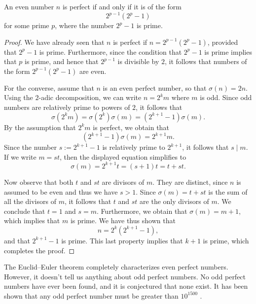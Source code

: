 \begin{theorem}
  An even number $n$ is perfect if and only if it is of the form
  \begin{equation*}
    2^{p-1}(2^p-1)
  \end{equation*}
  for some prime $p$, where the number $2^p-1$ is prime.
\end{theorem}

\begin{proof}
  We have already seen that $n$ is perfect if $n=2^{p-1}(2^p-1)$, provided that $2^p-1$ is prime. Furthermore, since the condition that $2^p-1$ is prime implies that $p$ is prime, and hence that $2^{p-1}$ is divisible by $2$, it follows that numbers of the form $2^{p-1}(2^p-1)$ are even.

  For the converse, assume that $n$ is an even perfect number, so that $\sigma(n)=2n$. Using the $2$-adic decomposition, we can write $n=2^km$ where $m$ is odd. Since odd numbers are relatively prime to powers of $2$, it follows that
  \begin{equation*}
    \sigma(2^km)=\sigma(2^k)\sigma(m)=(2^{k+1}-1)\sigma(m).
  \end{equation*}
  By the assumption that $2^km$ is perfect, we obtain that
  \begin{equation*}
    (2^{k+1}-1)\sigma(m)=2^{k+1}m.
  \end{equation*}
  Since the number $s:=2^{k+1}-1$ is relatively prime to $2^{k+1}$, it follows that $s\mid m$. If we write $m=st$, then the displayed equation simplifies to
  \begin{equation*}
    \sigma(m)=2^{k+1}t=(s+1)t=t+st.
  \end{equation*}
  
  Now observe that both $t$ and $st$ are divisors of $m$. They are distinct, since $n$ is assumed to be even and thus we have $s>1$. Since $\sigma(m)=t+st$ is the sum of all the divisors of $m$, it follows that $t$ and $st$ are the only divisors of $m$. We conclude that $t=1$ and $s=m$. Furthermore, we obtain that $\sigma(m)=m+1$, which implies that $m$ is prime. We have thus shown that
  \begin{equation*}
    n=2^k(2^{k+1}-1),
  \end{equation*}
  and that $2^{k+1}-1$ is prime. This last property implies that $k+1$ is prime, which completes the proof.
\end{proof}

The Euclid--Euler theorem completely characterizes even perfect numbers. However, it doesn't tell us anything about odd perfect numbers. No odd perfect numbers have ever been found, and it is conjectured that none exist. It has been shown that any odd perfect number must be greater than $10^{1500}$ \cite{ochem2012}. 

